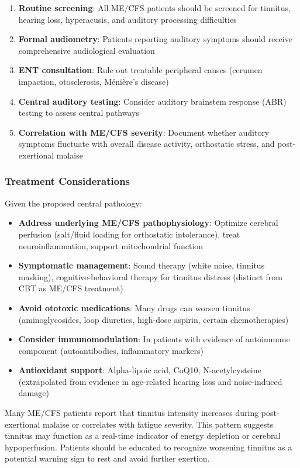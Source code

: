 \begin{enumerate}
    \item \textbf{Routine screening}: All ME/CFS patients should be screened for tinnitus, hearing loss, hyperacusis, and auditory processing difficulties
    \item \textbf{Formal audiometry}: Patients reporting auditory symptoms should receive comprehensive audiological evaluation
    \item \textbf{ENT consultation}: Rule out treatable peripheral causes (cerumen impaction, otosclerosis, Ménière's disease)
    \item \textbf{Central auditory testing}: Consider auditory brainstem response (ABR) testing to assess central pathways
    \item \textbf{Correlation with ME/CFS severity}: Document whether auditory symptoms fluctuate with overall disease activity, orthostatic stress, and post-exertional malaise
\end{enumerate}

\subsubsection{Treatment Considerations}

Given the proposed central pathology:

\begin{itemize}
    \item \textbf{Address underlying ME/CFS pathophysiology}: Optimize cerebral perfusion (salt/fluid loading for orthostatic intolerance), treat neuroinflammation, support mitochondrial function
    \item \textbf{Symptomatic management}: Sound therapy (white noise, tinnitus masking), cognitive-behavioral therapy for tinnitus distress (distinct from CBT as ME/CFS treatment)
    \item \textbf{Avoid ototoxic medications}: Many drugs can worsen tinnitus (aminoglycosides, loop diuretics, high-dose aspirin, certain chemotherapies)
    \item \textbf{Consider immunomodulation}: In patients with evidence of autoimmune component (autoantibodies, inflammatory markers)
    \item \textbf{Antioxidant support}: Alpha-lipoic acid, CoQ10, N-acetylcysteine (extrapolated from evidence in age-related hearing loss and noise-induced damage)
\end{itemize}

\begin{warning}
Many ME/CFS patients report that tinnitus intensity increases during post-exertional malaise or correlates with fatigue severity. This pattern suggests tinnitus may function as a real-time indicator of energy depletion or cerebral hypoperfusion. Patients should be educated to recognize worsening tinnitus as a potential warning sign to rest and avoid further exertion.
\end{warning}

